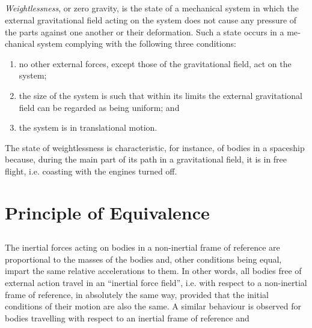 \subsection{}\label{7.3.7} \emph{Weightlessness}, or zero gravity, is the state of a mechan­ical system in which the external gravitational field acting on the system does not cause any pressure of the parts against one another or their deformation. Such a state occurs in a me­chanical system complying with the following three conditions: 
\begin{enumerate}[label=(\alph*)]
\item no other external forces, except those of the gravitational field, act on the system; 
\item the size of the system is such that within its limits the external gravitational field can be regarded
as being uniform; and 
\item the system is in translational motion. 
\end{enumerate}
The state of weightlessness is characteristic, for instance, of bodies in a spaceship because, during the main part of its path in a gravitational field, it is in free flight, i.e. coasting with the engines turned off.

\section{Principle of Equivalence}
\label{sec-7.4}

\subsection{}\label{7.4.1} The inertial forces acting on bodies in a non-inertial frame of reference are proportional to the masses of the bodies and, other conditions being equal, impart the same relative accelerations  to them. In other words, all bodies free of external action travel in an ``inertial force field'', i.e. with respect to a non-inertial frame of reference, in absolutely the same way, provided that the initial conditions of their motion are also the same. A similar behaviour is observed for bodies travelling with respect to an inertial frame of reference and

